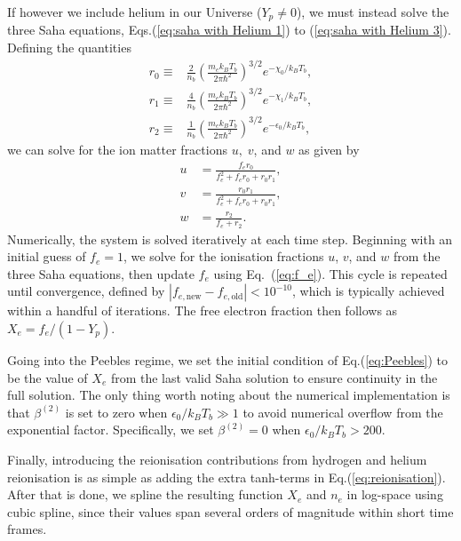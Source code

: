 \documentclass[twocolumn]{aa}
\begin{document}
If however we include helium in our Universe ($Y_p\neq 0$), we must instead solve the three Saha equations, Eqs.(\ref{eq:saha with Helium 1}) to (\ref{eq:saha with Helium 3}). Defining the quantities
\begin{align*}
      r_0\equiv& \frac{2}{n_b}\left(\frac{m_e k_BT_b}{2\pi\hbar^2}\right)^{3/2}e^{-\chi_0/k_BT_b},\\
      r_1\equiv& \frac{4}{n_b}\left(\frac{m_e k_BT_b}{2\pi\hbar^2}\right)^{3/2}e^{-\chi_1/k_BT_b},\\
      r_2\equiv& \frac{1}{n_b}\left(\frac{m_e k_BT_b}{2\pi\hbar^2}\right)^{3/2}e^{-\epsilon_0/k_BT_b},
\end{align*}
we can solve for the ion matter fractions $u,\; v$, and $w$ as given by
\begin{align*}
      u &= \frac{f_er_0}{f_e^2 + f_er_0 + r_0r_1},\\
      v &= \frac{r_0r_1}{f_e^2 + f_er_0 + r_0r_1},\\
      w &= \frac{r_2}{f_e + r_2}.
\end{align*}
Numerically, the system is solved iteratively at each time step. Beginning with an initial guess of $f_e = 1$, we solve for the ionisation fractions $u$, $v$, and $w$ from the three Saha equations, then update $f_e$ using Eq.~(\ref{eq:f_e}). This cycle is repeated until convergence, defined by $|f_{e,\mathrm{new}} - f_{e,\mathrm{old}}| < 10^{-10}$, which is typically achieved within a handful of iterations. The free electron fraction then follows as $X_e = f_e / (1 - Y_p)$.

Going into the Peebles regime, we set the initial condition of Eq.(\ref{eq:Peebles}) to be the value of $X_e$ from the last valid Saha solution to ensure continuity in the full solution. The only thing worth noting about the numerical implementation is that $\beta^{(2)}$ is set to zero when $\epsilon_0/k_BT_b \gg 1$ to avoid numerical overflow from the exponential factor. Specifically, we set $\beta^{(2)}=0$ when $\epsilon_0/k_BT_b>200$.

Finally, introducing the reionisation contributions from hydrogen and helium reionisation is as simple as adding the extra tanh-terms in Eq.(\ref{eq:reionisation}). After that is done, we spline the resulting function $X_e$ and $n_e$ in log-space using cubic spline, since their values span several orders of magnitude within short time frames.
\end{document}
